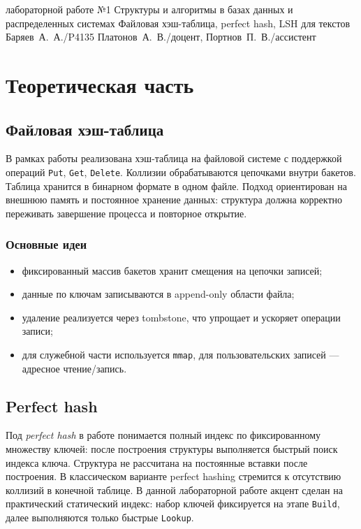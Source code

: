\documentclass{itmo}
\begin{document}
	{лабораторной работе №1}
	{Структуры и алгоритмы в базах данных и распределенных системах}
	{Файловая хэш-таблица, perfect hash, LSH для текстов}
	{}
	{Баряев~А.~А./P4135}
	{Платонов~А.~В./доцент, Портнов~П.~В./ассистент}

\maketableofcontents

\chapter{Теоретическая часть}

\section{Файловая хэш-таблица}

В рамках работы реализована хэш-таблица на файловой системе с поддержкой операций \texttt{Put}, \texttt{Get}, \texttt{Delete}.
Коллизии обрабатываются цепочками внутри бакетов.
Таблица хранится в бинарном формате в одном файле.
Подход ориентирован на внешнюю память и постоянное хранение данных:
структура должна корректно переживать завершение процесса и повторное открытие.

\subsection*{Основные идеи}
\begin{itemize}
	\item фиксированный массив бакетов хранит смещения на цепочки записей;
	\item данные по ключам записываются в append-only области файла;
	\item удаление реализуется через tombstone, что упрощает и ускоряет операции записи;
	\item для служебной части используется \texttt{mmap}, для пользовательских записей --- адресное чтение/запись.
\end{itemize}

\section{Perfect hash}

Под \textit{perfect hash} в работе понимается полный индекс по фиксированному множеству ключей:
после построения структуры выполняется быстрый поиск индекса ключа.
Структура не рассчитана на постоянные вставки после построения.
В классическом варианте perfect hashing стремится к отсутствию коллизий в конечной таблице.
В данной лабораторной работе акцент сделан на практический статический индекс:
набор ключей фиксируется на этапе \texttt{Build}, далее выполняются только быстрые \texttt{Lookup}.
\end{document}
